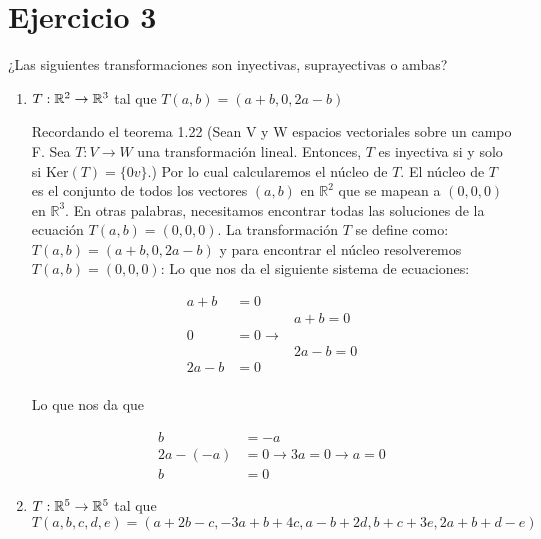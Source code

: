 \section*{Ejercicio 3}

¿Las siguientes transformaciones son inyectivas, suprayectivas o ambas?

\begin{enumerate}
    \item $T: \mathbb{R}^{2} \rightarrow \mathbb{R}^{3}$ tal que $T(a,b) = (a + b, 0, 2a - b)$
    

    Recordando el teorema 1.22 (Sean V y W espacios vectoriales sobre un campo F. Sea \(T:V \to W\) una transformación lineal. Entonces, \(T\) es inyectiva si y solo si \(\text{Ker}(T)=\{0v\}\).) Por lo cual calcularemos el núcleo de \(T\).
    El núcleo de \(T\) es el conjunto de todos los vectores \((a, b)\) en \(\mathbb{R}^2\) que se mapean a \((0, 0, 0)\) en \(\mathbb{R}^3\). En otras palabras, necesitamos encontrar todas las soluciones de la ecuación \(T(a,b) = (0, 0, 0)\).
    La transformación \(T\) se define como: \(T(a,b) = (a+b, 0, 2a-b)\) y para encontrar el núcleo resolveremos \(T(a,b) = (0, 0, 0)\): Lo que nos da el siguiente sistema de ecuaciones:

    
    \begin{align*}
    a + b & = 0 & \\
          &     & a+b = 0\\
    0     & = 0 \rightarrow &  \\
          &     & 2a-b = 0\\
    2a-b  & = 0 &  \\
    \end{align*}


    Lo que nos da que

    \begin{align*}
    b & = -a \\
    2a-(-a) & = 0 \rightarrow 3a = 0 \rightarrow a = 0 \\
    b & = 0
    \end{align*}







    \item $T: \mathbb{R}^{5} \rightarrow \mathbb{R}^{5}$ tal que $T(a,b,c,d,e)  = (a + 2b -c, -3a + b + 4c, a - b + 2d, b + c +3e, 2a +b+d-e)$
\end{enumerate}